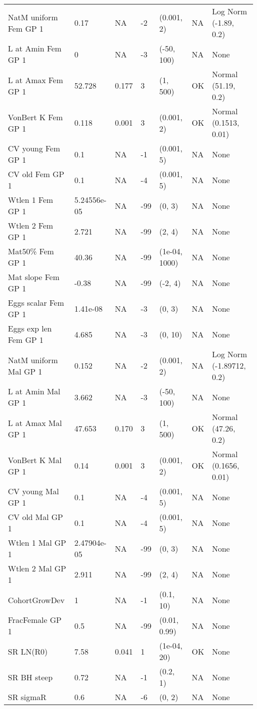 \documentclass[11pt,
  letterpaper,
]{article}
\begin{document}
\begin{landscape}
\begin{longtable}[t]{>{\raggedright\arraybackslash}p{7.5cm}lllll>{\raggedright\arraybackslash}p{3.5cm}}
\endfoot
\bottomrule
\endlastfoot
NatM uniform Fem GP 1 & 0.17 & NA & -2 & (0.001, 2) & NA & Log Norm (-1.89, 0.2)\\
L at Amin Fem GP 1 & 0 & NA & -3 & (-50, 100) & NA & None\\
L at Amax Fem GP 1 & 52.728 & 0.177 & 3 & (1, 500) & OK & Normal (51.19, 0.2)\\
VonBert K Fem GP 1 & 0.118 & 0.001 & 3 & (0.001, 2) & OK & Normal (0.1513, 0.01)\\
CV young Fem GP 1 & 0.1 & NA & -1 & (0.001, 5) & NA & None\\
CV old Fem GP 1 & 0.1 & NA & -4 & (0.001, 5) & NA & None\\
Wtlen 1 Fem GP 1 & 5.24556e-05 & NA & -99 & (0, 3) & NA & None\\
Wtlen 2 Fem GP 1 & 2.721 & NA & -99 & (2, 4) & NA & None\\
Mat50\% Fem GP 1 & 40.36 & NA & -99 & (1e-04, 1000) & NA & None\\
Mat slope Fem GP 1 & -0.38 & NA & -99 & (-2, 4) & NA & None\\
Eggs scalar Fem GP 1 & 1.41e-08 & NA & -3 & (0, 3) & NA & None\\
Eggs exp len Fem GP 1 & 4.685 & NA & -3 & (0, 10) & NA & None\\
NatM uniform Mal GP 1 & 0.152 & NA & -2 & (0.001, 2) & NA & Log Norm (-1.89712, 0.2)\\
L at Amin Mal GP 1 & 3.662 & NA & -3 & (-50, 100) & NA & None\\
L at Amax Mal GP 1 & 47.653 & 0.170 & 3 & (1, 500) & OK & Normal (47.26, 0.2)\\
VonBert K Mal GP 1 & 0.14 & 0.001 & 3 & (0.001, 2) & OK & Normal (0.1656, 0.01)\\
CV young Mal GP 1 & 0.1 & NA & -4 & (0.001, 5) & NA & None\\
CV old Mal GP 1 & 0.1 & NA & -4 & (0.001, 5) & NA & None\\
Wtlen 1 Mal GP 1 & 2.47904e-05 & NA & -99 & (0, 3) & NA & None\\
Wtlen 2 Mal GP 1 & 2.911 & NA & -99 & (2, 4) & NA & None\\
CohortGrowDev & 1 & NA & -1 & (0.1, 10) & NA & None\\
FracFemale GP 1 & 0.5 & NA & -99 & (0.01, 0.99) & NA & None\\
SR LN(R0) & 7.58 & 0.041 & 1 & (1e-04, 20) & OK & None\\
SR BH steep & 0.72 & NA & -1 & (0.2, 1) & NA & None\\
SR sigmaR & 0.6 & NA & -6 & (0, 2) & NA & None\\

\end{longtable}
\end{landscape}
\end{document}
